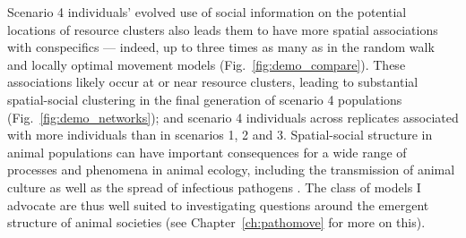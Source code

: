 \begin{interludeenv}
Scenario 4 individuals' evolved use of social information on the potential locations of resource clusters also leads them to have more spatial associations with conspecifics --- indeed, up to three times as many as in the random walk and locally optimal movement models (Fig.~\ref{fig:demo_compare}).
These associations likely occur at or near resource clusters, leading to substantial spatial-social clustering in the final generation of scenario 4 populations (Fig.~\ref{fig:demo_networks}); and scenario 4 individuals across replicates associated with more individuals than in scenarios 1, 2 and 3.
Spatial-social structure in animal populations can have important consequences for a wide range of processes and phenomena in animal ecology, including the transmission of animal culture as well as the spread of infectious pathogens \parencite{romano2020,romano2021,cantor2021}.
The class of models I advocate are thus well suited to investigating questions around the emergent structure of animal societies (see Chapter~\ref{ch:pathomove} for more on this).


\end{interludeenv}
